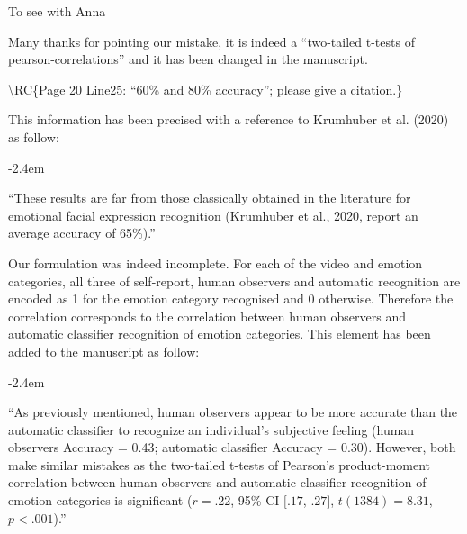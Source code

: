 \documentclass[]{article}
\renewenvironment{quote}{\begin{fquote}\advance\leftmargini -2.4em\begin{oldquote}}{\end{oldquote}\end{fquote}}
\newenvironment{fquote}
  {\def\FrameCommand{
	\fboxsep=0.6em %
	\fcolorbox{black}{white}}%
    \MakeFramed {\advance\hsize-2\width \FrameRestore}
    \begin{minipage}{\linewidth}
  }
  {\end{minipage}\endMakeFramed}
\begin{document}
To see with Anna


Many thanks for pointing our mistake, it is indeed a ``two-tailed t-tests of pearson-correlations'' and it has been changed in the manuscript.

\textbackslash RC\{Page 20 Line25: ``60\% and 80\% accuracy''; please give a citation.\}

This information has been precised with a reference to Krumhuber et al. (2020) as follow:

\begin{quote}
``These results are far from those classically obtained in the literature for emotional facial expression recognition (Krumhuber et al., 2020, report an average accuracy of 65\%).''
\end{quote}


Our formulation was indeed incomplete. For each of the video and emotion categories, all three of self-report, human observers and automatic recognition are encoded as 1 for the emotion category recognised and 0 otherwise. Therefore the correlation corresponds to the correlation between human observers and automatic classifier recognition of emotion categories. This element has been added to the manuscript as follow:

\begin{quote}
``As previously mentioned, human observers appear to be more accurate than the automatic classifier to recognize an individual's subjective feeling (human observers Accuracy = 0.43; automatic classifier Accuracy = 0.30). However, both make similar mistakes as the two-tailed t-tests of Pearson's product-moment correlation between human observers and automatic classifier recognition of emotion categories is significant (\(r = .22\), 95\% CI \([.17\), \(.27]\), \(t(1384) = 8.31\), \(p < .001\)).''
\end{quote}

\end{document}
